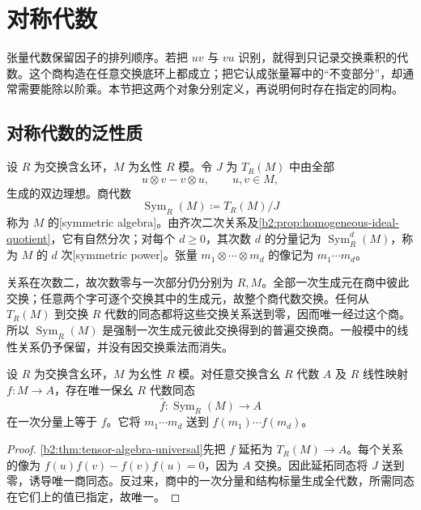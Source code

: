 
\section{对称代数}
\label{b2:sec:0803}

张量代数保留因子的排列顺序。若把 \(uv\) 与 \(vu\) 识别，就得到只记录交换乘积的代数。这个商构造在任意交换底环上都成立；把它认成张量幂中的“不变部分”，却通常需要能除以阶乘。本节把这两个对象分别定义，再说明何时存在指定的同构。

%
%

\subsection{对称代数的泛性质}
\label{b2:subsec:0803:01}

\begin{definition}\label{b2:def:symmetric-algebra}
	设 \(R\) 为交换含幺环，\(M\) 为幺性 \(R\) 模。令 \(J\) 为 \(T_R(M)\) 中由全部
	\[
		u\otimes v-v\otimes u,\qquad u,v\in M,
	\]
	生成的双边理想。商代数
	\[
		\operatorname{Sym}_R(M)\coloneqq T_R(M)/J
	\]
	称为 \(M\) 的[symmetric algebra]。由齐次二次关系及\cref{b2:prop:homogeneous-ideal-quotient}，它有自然分次；对每个 \(d\ge0\)，其次数 \(d\) 的分量记为 \(\operatorname{Sym}_R^d(M)\)，称为 \(M\) 的 \(d\) 次[symmetric power]。张量 \(m_1\otimes\cdots\otimes m_d\) 的像记为 \(m_1\cdots m_d\)。
\end{definition}

关系在次数二，故次数零与一次部分仍分别为 \(R,M\)。全部一次生成元在商中彼此交换；任意两个字可逐个交换其中的生成元，故整个商代数交换。任何从 \(T_R(M)\) 到交换 \(R\) 代数的同态都将这些交换关系送到零，因而唯一经过这个商。所以 \(\operatorname{Sym}_R(M)\) 是强制一次生成元彼此交换得到的普遍交换商。一般模中的线性关系仍予保留，并没有因交换乘法而消失。

\begin{theorem}[对称代数的泛性质]\label{b2:thm:symmetric-algebra-universal}
	设 \(R\) 为交换含幺环，\(M\) 为幺性 \(R\) 模。对任意交换含幺 \(R\) 代数 \(A\) 及 \(R\) 线性映射 \(f:M\rightarrow A\)，存在唯一保幺 \(R\) 代数同态
	\[
		\widehat f:\operatorname{Sym}_R(M)\longrightarrow A
	\]
	在一次分量上等于 \(f\)。它将 \(m_1\cdots m_d\) 送到 \(f(m_1)\cdots f(m_d)\)。
\end{theorem}
\begin{proof}
	\cref{b2:thm:tensor-algebra-universal}先把 \(f\) 延拓为 \(T_R(M)\rightarrow A\)。每个关系的像为 \(f(u)f(v)-f(v)f(u)=0\)，因为 \(A\) 交换。因此延拓同态将 \(J\) 送到零，诱导唯一商同态。反过来，商中的一次分量和结构标量生成全代数，所需同态在它们上的值已指定，故唯一。
\end{proof}

